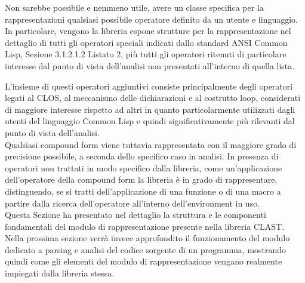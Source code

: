 Non sarebbe possibile e nemmeno utile, avere un classe specifica per la
rappresentazioni qualsiasi possibile operatore definito da un utente e
linguaggio. In particolare, vengono la libreria espone strutture per la
rappresentazione nel dettaglio di tutti gli operatori speciali indicati dallo
standard ANSI Common Lisp, Sezione 3.1.2.1.2 Listato 2, più tutti gli operatori
ritenuti di particolare interesse dal punto di vista dell’analisi non presentati
all’interno di quella lista.

L'insieme di questi operatori aggiuntivi consiste principalmente degli
operatori legati al CLOS, al meccanismo delle dichiarazioni e al costrutto
loop, considerati di maggiore interesse rispetto ad altri in quanto
particolarmente utilizzati dagli utenti del linguaggio Common Lisp e quindi
significativamente più rilevanti dal punto di vista dell’analisi.\\

Qualsiasi compound form viene tuttavia rappresentata con il maggiore grado di
precisione possibile, a seconda dello specifico caso in analisi. In presenza di
operatori non trattati in modo specifico dalla libreria, come un'applicazione
dell'operatore della compound form la libreria è in grado di rappresentare,
distinguendo, se si tratti dell’applicazione di una funzione o di una macro a
partire dalla ricerca dell'operatore all'interno dell'environment in uso.\\

Questa Sezione ha presentato nel dettaglio la struttura e le componenti
fondamentali del modulo di rappresentazione presente nella libreria CLAST.
Nella prossima sezione verrà invece approfondito il funzionamento del modulo
dedicato a parsing e analisi del codice sorgente di un programma, mostrando
quindi come gli elementi del modulo di rappresentazione vengano realmente
impiegati dalla libreria stessa.
